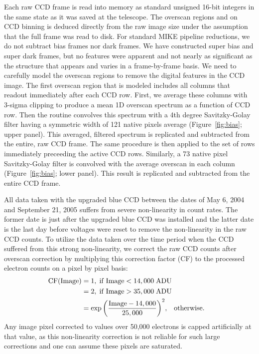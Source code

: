 \documentclass[12pt,preprint]{aastex}
\begin{document}
Each raw CCD frame is read into memory as standard unsigned 16-bit integers 
in the same state as it was saved at the telescope.  The overscan regions
and on CCD binning is deduced directly from the raw image size
under the assumption that the full frame was read to disk.
For standard MIKE pipeline reductions, we do not subtract bias frames nor
dark frames.  We have constructed super bias and super dark frames, but no
features were apparent and not nearly as significant as the structure that
appears and varies in a frame-by-frame basis.  
We need to carefully model the overscan regions
to remove the digital features in the CCD image.  The first overscan
region that is modeled includes all columns that readout 
immediately after each CCD row.  First, we 
average these columns with 3-sigma clipping to produce a mean 1D 
overscan spectrum as a function of CCD row.
Then the routine convolves this spectrum with 
a 4th degree Savitzky-Golay filter having 
a symmetric width of 121 native pixels average 
(Figure~\ref{fig:bias}; upper panel). 
This averaged, filtered spectrum is replicated and subtracted from
the entire, raw CCD frame.  %
The same procedure is then applied to the set of rows 
immediately preceeding the active CCD rows.  Similarly, a 73 native pixel 
Savitzky-Golay filter is convolved with the average overscan in each column
(Figure~\ref{fig:bias}; lower panel).
This result is replicated and subtracted from the entire CCD frame.

All data taken with the upgraded blue CCD between the dates of May 6, 2004 
and September 21, 2005 suffers from severe non-linearity in count rates.  
The former date is just after the upgraded blue CCD was installed and the
latter date is the last day before voltages were reset to remove the 
non-linearity in the raw CCD counts.  To utilize the data taken over the
time period when the CCD suffered from this strong non-linearity, 
we correct the raw CCD counts after overscan correction by
multiplying this correction factor (CF) to the processed electron counts
on a pixel by pixel basis:
\begin{eqnarray}
{\rm CF(Image)} &= 1, \; {\rm if \; Image} < 14,000 \;{\rm ADU} \\
                        &= 2, \; {\rm if \; Image} > 35,000 \;{\rm ADU} \nonumber\\
                        &= \exp{\left(\frac{{\rm Image}-14,000}{25,000}\right)^2}, 
                            \;\;\; {\rm otherwise.}\;\;\; \nonumber
\end{eqnarray}
Any image pixel corrected to values over 50,000 electrons is capped 
artificially at that value, as
this non-linearity correction is not reliable for such large corrections
and one can assume these pixels are saturated.
\end{document}
